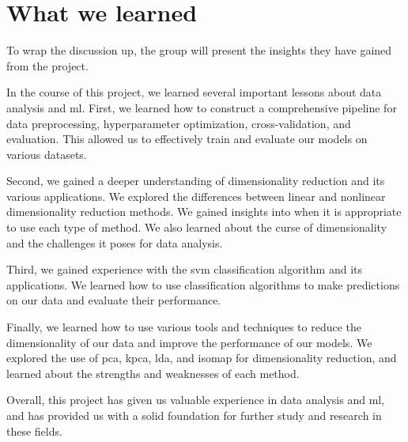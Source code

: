 \section{What we learned}\label{sec:what-we-learned}
To wrap the discussion up, the group will present the insights they have gained from the project. 


In the course of this project, we learned several important lessons about data analysis and \gls{ml}. First, we learned how to construct a comprehensive pipeline for data preprocessing, hyperparameter optimization, cross-validation, and evaluation. This allowed us to effectively train and evaluate our models on various datasets.

Second, we gained a deeper understanding of dimensionality reduction and its various applications. We explored the differences between linear and nonlinear dimensionality reduction methods. We gained insights into when it is appropriate to use each type of method. We also learned about the curse of dimensionality and the challenges it poses for data analysis.

Third, we gained experience with the \gls{svm} classification algorithm and its applications. We learned how to use classification algorithms to make predictions on our data and evaluate their performance.

Finally, we learned how to use various tools and techniques to reduce the dimensionality of our data and improve the performance of our models. We explored the use of \gls{pca}, \gls{kpca}, \gls{lda}, and \gls{isomap} for dimensionality reduction, and learned about the strengths and weaknesses of each method.

Overall, this project has given us valuable experience in data analysis and \gls{ml}, and has provided us with a solid foundation for further study and research in these fields.





